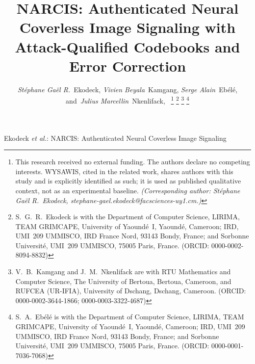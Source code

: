 \documentclass[10pt,journal]{IEEEtran}
\begin{document}
\title{NARCIS: Authenticated Neural Coverless Image Signaling
  with Attack-Qualified Codebooks and Error Correction}

\author{\emph{St\'{e}phane Ga\"{e}l R.}~Ekodeck,
        \emph{Vivien Beyala}~Kamgang,
        \emph{Serge Alain}~Eb\'{e}l\'{e},
        and~\emph{Julius Marcellin}~Nkenlifack,~
\thanks{This research received no external funding. The authors declare no
  competing interests. WYSAWIS, cited in the related work, shares authors
  with this study and is explicitly identified as such; it is used as
  published qualitative context, not as an experimental baseline.
  \emph{(Corresponding author: St\'ephane Ga\"el R.~Ekodeck,
  stephane-gael.ekodeck@facsciences-uy1.cm.)}}
\thanks{S.~G.~R.~Ekodeck is with the Department of Computer Science,
  LIRIMA, TEAM GRIMCAPE, University of Yaound\'e~I, Yaound\'e, Cameroon;
  IRD, UMI~209 UMMISCO, IRD France Nord, 93143 Bondy, France; and
  Sorbonne Universit\'e, UMI~209 UMMISCO, 75005 Paris, France.
  (ORCID: 0000-0002-8094-8832)}
\thanks{V.~B.~Kamgang and J.~M.~Nkenlifack are with RTU Mathematics and
  Computer Science, The University of Bertoua, Bertoua, Cameroon, and
  RUFCEA (UR-IFIA), University of Dschang, Dschang, Cameroon.
  (ORCID: 0000-0002-3644-1866; 0000-0003-3322-4687)}
\thanks{S.~A.~Eb\'el\'e is with the Department of Computer Science,
  LIRIMA, TEAM GRIMCAPE, University of Yaound\'e~I, Yaound\'e, Cameroon;
  IRD, UMI~209 UMMISCO, IRD France Nord, 93143 Bondy, France; and
  Sorbonne Universit\'e, UMI~209 UMMISCO, 75005 Paris, France.
  (ORCID: 0000-0001-7036-7068)}}

%
{Ekodeck \MakeLowercase{\textit{et al.}}: NARCIS: Authenticated
  Neural Coverless Image Signaling}

\maketitle
\end{document}
